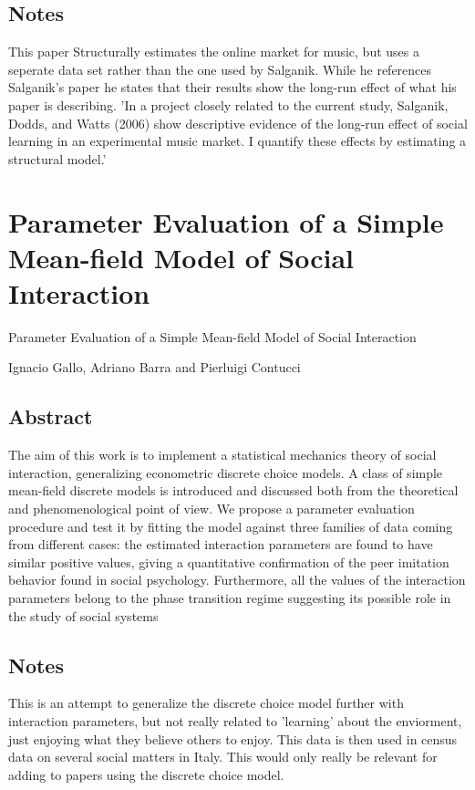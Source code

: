 \documentclass[12pt]{article}
\begin{document}
\subsection{Notes}

This paper Structurally estimates the online market for music, but
uses a seperate data set rather than the one used by Salganik.  While
he references Salganik's paper he states that their results show the
long-run effect of what his paper is describing.  'In a project
closely related to the current study, Salganik, Dodds, and Watts
(2006) show descriptive evidence of the long-run effect of social
learning in an experimental music market. I quantify these effects by
estimating a structural model.'

\section{Parameter Evaluation of a Simple Mean-field Model of Social Interaction}

Parameter Evaluation of a Simple Mean-field Model of Social Interaction\par
Ignacio Gallo, Adriano Barra and Pierluigi Contucci\par

\subsection{Abstract}
The aim of this work is to implement a statistical mechanics theory of
social interaction, generalizing econometric discrete choice models. A
class of simple mean-field discrete models is introduced and discussed
both from the theoretical and phenomenological point of view. We
propose a parameter evaluation procedure and test it by fitting the
model against three families of data coming from different cases: the
estimated interaction parameters are found to have similar positive
values, giving a quantitative confirmation of the peer imitation
behavior found in social psychology. Furthermore, all the values of
the interaction parameters belong to the phase transition regime
suggesting its possible role in the study of social systems

\subsection{Notes}

This is an attempt to generalize the discrete choice model further
with interaction parameters, but not really related to 'learning'
about the enviorment, just enjoying what they believe others to
enjoy. This data is then used in census data on several social matters
in Italy. This would only really be relevant for adding to papers
using the discrete choice model.
\end{document}
